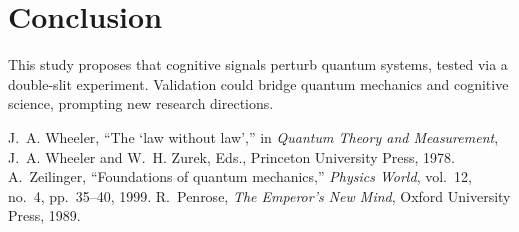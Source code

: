 \documentclass[12pt]{article}
\begin{document}
\section{Conclusion}
This study proposes that cognitive signals perturb quantum systems, tested via a double-slit experiment. Validation could bridge quantum mechanics and cognitive science, prompting new research directions.

\clearpage
\begin{thebibliography}{1}
J.~A. Wheeler, ``The `law without law','' in \emph{Quantum Theory and Measurement}, J.~A. Wheeler and W.~H. Zurek, Eds., Princeton University Press, 1978.
A.~Zeilinger, ``Foundations of quantum mechanics,'' \emph{Physics World}, vol.~12, no.~4, pp.~35--40, 1999.
R.~Penrose, \emph{The Emperor's New Mind}, Oxford University Press, 1989.
\end{thebibliography}
\end{document}
